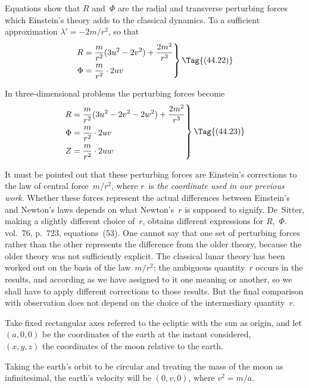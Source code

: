 \documentclass[12pt]{book}
\begin{document}
Equations  show that $R$ and~$\Phi$ are the radial and transverse perturbing
forces which Einstein's theory adds to the classical dynamics. To a
sufficient approximation $\lambda' = -2m/r^{2}$, so that
\[
\left.
\begin{aligned}
  R &= \frac{m}{r^{2}} (3u^2 - 2v^2) + \frac{2m^{2}}{r^{3}}\\
  \Phi &= \frac{m}{r^{2}} \cdot 2 u v
\end{aligned}
\right\}
\Tag{(44.22)}
\]

In three\hyp{}dimensional problems the perturbing forces become
\[
\left.
\begin{aligned}
  R &= \frac{m}{r^{2}} (3u^2 - 2v^2 - 2w^{2}) + \frac{2m^{2}}{r^{3}}\\
  \Phi &= \frac{m}{r^{2}} \cdot 2 u v\\
  Z &= \frac{m}{r^{2}} \cdot 2 u w
\end{aligned}
\right\}
\Tag{(44.23)}
\]

It must be pointed out that these perturbing forces are Einstein's corrections
to the law of central force~$m/r^{2}$, where $r$~is \emph{the coordinate used in our
previous work}. Whether these forces represent the actual differences between
Einstein's and Newton's laws depends on what Newton's~$r$ is supposed to
signify. De~Sitter, making a slightly different choice of~$r$, obtains different
expressions for $R$,~$\Phi$\footnotemark.\footnotetext
  { vol.~76, p.~723, equations~(53).}
One cannot say that one set of perturbing forces
rather than the other represents the difference from the older theory, because
the older theory was not sufficiently explicit. The classical lunar theory
has been worked out on the basis of the law~$m/r^{2}$; the ambiguous quantity~$r$
occurs in the results, and according as we have assigned to it one meaning or
another, so we shall have to apply different corrections to those results. But
the final comparison with observation does not depend on the choice of the
intermediary quantity~$r$.

Take fixed rectangular axes referred to the ecliptic with the sun as origin,
and let \\
\Indent $(a, 0, 0)$ be the coordinates of the earth at the instant considered, \\
\Indent $(x, y, z)$ the coordinates of the moon relative to the earth.

Taking the earth's orbit to be circular and treating the mass of the moon
as infinitesimal, the earth's velocity will be $(0, v, 0)$, where $v^2 = m/a$.
\end{document}
